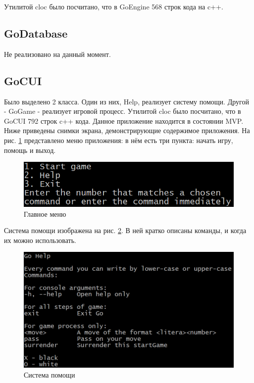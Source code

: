 Утилитой cloc было посчитано, что в GoEngine 568 строк кода на c++.

\subsection*{GoDatabase}

Не реализовано на данный момент.\\

\subsection*{GoCUI}

Было выделено 2 класса. Один из них, Help, реализует систему помощи. Другой - GoGame - реализует игровой процесс. Утилитой cloc было посчитано, что в GoCUI 792 строк c++ кода. Данное приложение находится в состоянии MVP.\\

Ниже приведены снимки экрана, демонстрирующие содержимое приложения. На рис. \ref{pic:CUI_Menu} представлено меню приложения: в нём есть три пункта: начать игру, помощь и выход.

\begin{figure}[H]
	\begin{center}
		\includegraphics[scale=0.6]{pics/GoCUI/Menu.png}
	    \caption{Главное меню} 
		\label{pic:CUI_Menu}
	\end{center}
\end{figure}

Система помощи изображена на рис. \ref{pic:CUI_Help}. В ней кратко описаны команды, и когда их можно использовать.

\begin{figure}[H]
	\begin{center}
		\includegraphics[scale=0.6]{pics/GoCUI/Help.png}
	    \caption{Система помощи} 
		\label{pic:CUI_Help}
	\end{center}
\end{figure}

